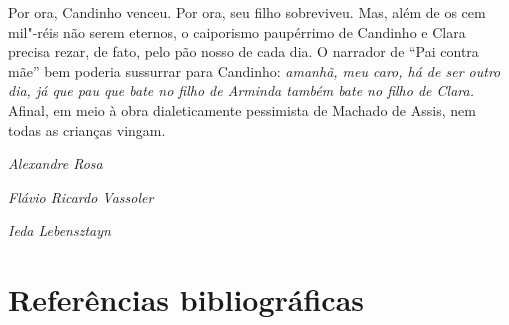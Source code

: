 Por ora, Candinho venceu. Por ora, seu filho sobreviveu. Mas, além de os
cem mil"-réis não serem eternos, o caiporismo paupérrimo de Candinho e
Clara precisa rezar, de fato, pelo pão nosso de cada dia. O narrador de
``Pai contra mãe'' bem poderia sussurrar para Candinho: \emph{amanhã,
meu caro, há de ser outro dia, já que pau que bate no filho de Arminda
também bate no filho de Clara.} Afinal, em meio à obra dialeticamente
pessimista de Machado de Assis, nem todas as crianças vingam.

\vfill

\begin{flushright}
\emph{Alexandre Rosa}

\emph{Flávio Ricardo Vassoler}

\emph{Ieda Lebensztayn}
\end{flushright}

\pagebreak

\section{Referências bibliográficas}

